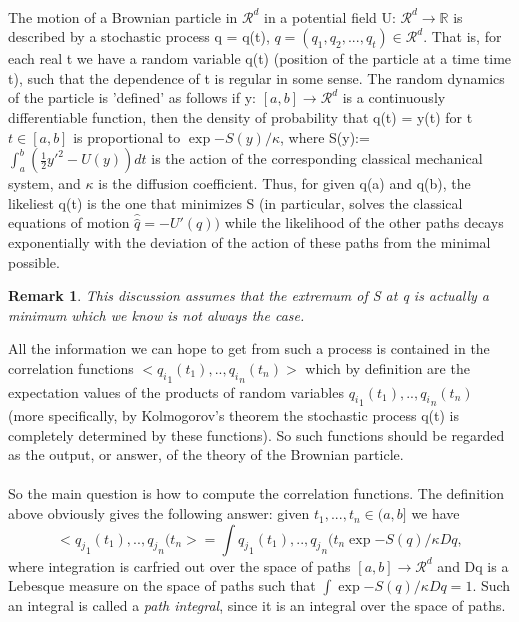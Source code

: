 \documentclass[preprint, 5p, 10pt]{elsarticle}
\theoremstyle{plain}
\newtheorem{remark}[theorem]{Remark}
\begin{document}
   \paragraph{} The motion of a Brownian particle in $\mathcal{R}^{d}$ in a potential field U: $\mathcal{R}^{d} \rightarrow \mathbb{R}$
is described by a stochastic process q = q(t), $q = (q_1,q_2,...,q_t) \in \mathcal{R}^{d}.$
That is, for each real t we have a random variable q(t) (position of the particle at a time time t), such that the dependence of t is regular
in some sense. The random dynamics of the particle is 'defined' as follows if y: $[a,b] \rightarrow \mathcal{R}^{d}$ is a continuously differentiable
function, then the density of probability that q(t) = y(t) for t $t \in [a,b]$ is proportional to $\exp{-S(y)/\kappa}$, where S(y):=
$\int_{a}^{b}(\frac{1}{2}y'^{2}-U(y))dt$ is the action of the corresponding classical mechanical system, and $\kappa$ is the diffusion coefficient. 
Thus, for given q(a) and q(b), the likeliest q(t) is the one that minimizes S (in particular, solves the classical equations of motion $\hat{\hat{q}} = - U'(q))$
while the likelihood of the other paths decays exponentially with the deviation of the action of these paths from the minimal possible. 
\begin{remark}
 This discussion assumes that the extremum of S at q is actually a minimum which we know is not always the case. 
\end{remark}
All the information we can hope to get from such a process is contained in the correlation functions $< {q_i}_1(t_{1}),..,{q_i}_{n}(t_{n})>$ which by definition 
are the expectation values of the products of random variables ${q_i}_{1} (t_{1}),..,{q_i}_{n}(t_{n})$
(more specifically, by Kolmogorov's theorem the stochastic process q(t) is completely determined by these functions).
So such functions should be regarded as the output, or answer, of the theory of the Brownian particle. 
\paragraph{}
 So the main question is how to compute the correlation functions. The definition above obviously gives the following answer: given $t_{1},...,t_{n} \in (a,b]$
we have 
 \begin{equation*}
  <{q_j}_1(t_{1}),..,{q_j}_{n}(t_{n}> = \int {q_j}_1(t_{1}),..,{q_j}_{n}(t_{n}\exp{-S(q)/\kappa}Dq,
 \end{equation*}
where integration is carfried out over the space of paths $[a,b] \rightarrow \mathcal{R}^{d}$ and Dq is a Lebesque measure on the space
of paths such that $\int \exp{-S(q)/\kappa}Dq=1$. Such an integral is called a \textit{path integral}, since it is an integral over the space of paths.
\end{document}
